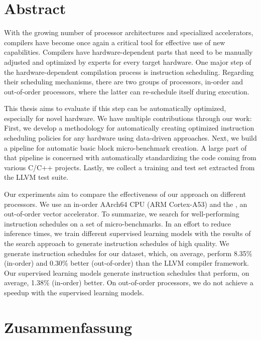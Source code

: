 \chapter*{Abstract}
With the growing number of processor architectures and specialized accelerators, compilers have become once again a critical tool for effective use of new capabilities.
Compilers have hardware-dependent parts that need to be manually adjusted and optimized by experts for every target hardware.
One major step of the hardware-dependent compilation process is instruction scheduling.
Regarding their scheduling mechanisms, there are two groups of processors, in-order and out-of-order processors, where the latter can re-schedule itself during execution.

This thesis aims to evaluate if this step can be automatically optimized, especially for novel hardware.
We have multiple contributions through our work:
First, we develop a methodology for automatically creating optimized instruction scheduling policies for any hardware using data-driven approaches.
Next, we build a pipeline for automatic basic block micro-benchmark creation.
A large part of that pipeline is concerned with automatically standardizing the code coming from various C/C++ projects.
Lastly, we collect a training and test set extracted from the LLVM test suite.

Our experiments aim to compare the effectiveness of our approach on different processors.
We use an in-order AArch64 CPU (ARM Cortex-A53) and the \aurora, an out-of-order vector accelerator.
To summarize, we search for well-performing instruction schedules on a set of micro-benchmarks.
In an effort to reduce inference times, we train different supervised learning models with the results of the search approach to generate instruction schedules of high quality.
We generate instruction schedules for our dataset, which, on average, perform 8.35\% (in-order) and 0.30\% better (out-of-order) than the LLVM compiler framework.
Our supervised learning models generate instruction schedules that perform, on average, 1.38\% (in-order) better.
On out-of-order processors, we do not achieve a speedup with the supervised learning models.

\chapter*{Zusammenfassung}
